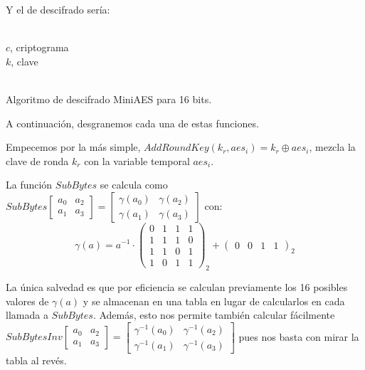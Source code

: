 	Y el de descifrado sería:	
	\begin{algorithm}[H]
		\begin{algorithmic}[1]
			\REQUIRE \ \\
				\texttt{$c$}, criptograma \\
				\texttt{$k$}, clave\\ \

		\end{algorithmic}
		\caption{Algoritmo de descifrado MiniAES para 16 bits.}
		\label{DecMiniAES}
	\end{algorithm}
	
	A continuación, desgranemos cada una de estas funciones.
	
	Empecemos por la más simple, $AddRoundKey(k_r, aes_i) = k_r \oplus aes_i$, mezcla la clave de ronda $k_r$
	con la variable temporal $aes_i$.
	
	La función $SubBytes$ se calcula como $SubBytes \left[\begin{matrix}a_0 & a_2\\ a_1 & a_3\end{matrix}\right]
	= \left[\begin{matrix}\gamma(a_0) & \gamma(a_2) \\ \gamma(a_1) & \gamma(a_3)\end{matrix}\right]$ con:
	$$\gamma(a) = a^{-1} \cdot \left(\begin{matrix} 0 & 1 & 1 & 1 \\ 1 & 1 & 1 & 0 \\ 1 & 1 & 0 & 1 \\
	1 & 0 & 1 & 1 \end{matrix}\right)_2 + \left(\begin{matrix} 0 & 0 & 1 & 1 \end{matrix}\right)_2$$
	
	La única salvedad es que por eficiencia se calculan previamente los 16 posibles valores de $\gamma(a)$ y se
	almacenan en una tabla en lugar de calcularlos en cada llamada a $SubBytes$. Además, esto nos permite también
	calcular fácilmente $SubBytesInv \left[\begin{matrix}a_0 & a_2\\ a_1 & a_3\end{matrix}\right] =
	\left[\begin{matrix}\gamma^{-1}(a_0) & \gamma^{-1}(a_2) \\ \gamma^{-1}(a_1) & \gamma^{-1}(a_3)\end{matrix}\right]$
	pues nos basta con mirar la tabla al revés.
	
